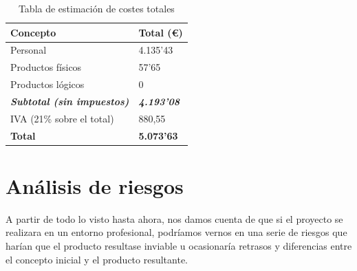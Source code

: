 \begin{center}
	\begin{table}[H]
		\centering
		\begin{tabularx}{10cm}{|X|X|}
			\hline
			{\cellcolor{lightblue}}\textbf{Concepto} & {\cellcolor{lightblue}}\textbf{Total (€)}  \\
			\hline
			Personal & 4.135'43 \\
			\hline
			Productos físicos & 57'65 \\
			\hline
			Productos lógicos & 0\\
			\hline
			\textbf{\textit{Subtotal (sin impuestos)}} & \textbf{\textit{4.193'08}}\\
			\hline
			IVA (21\% sobre el total) & 880,55\\
			\hline
			\textbf{Total} & \textbf{5.073'63} \\
			\hline
		\end{tabularx}
		\caption{Tabla de estimación de costes totales}
	\end{table}
\end{center}

\section{Análisis de riesgos}

A partir de todo lo visto hasta ahora, nos damos cuenta de que si el proyecto se realizara en un entorno profesional, podríamos vernos en una serie de riesgos que harían que el producto resultase inviable u ocasionaría retrasos y diferencias entre el concepto inicial y el producto resultante.




